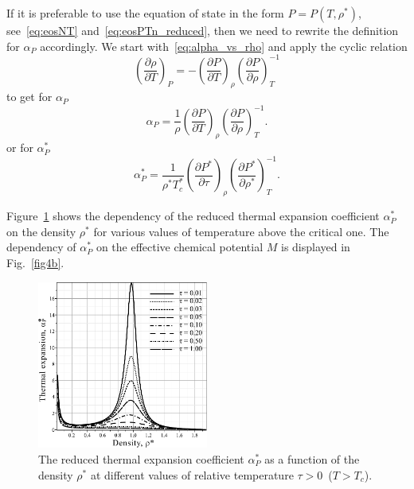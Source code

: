If it is preferable to use the equation of state in the form $P=P(T, \rho^*)$, see~\eqref{eq:eosNT} and~\eqref{eq:eosPTn_reduced}, then we need to rewrite the definition for $\alpha_P$ accordingly. We start with~\eqref{eq:alpha_vs_rho} and apply the cyclic relation
\begin{equation}
	\left(\frac{\partial \rho}{\partial T}\right)_P = - \left(\frac{\partial P}{\partial T}\right)_{\rho} \left(\frac{\partial P}{\partial \rho}\right)^{-1}_T
\end{equation}
to get for $\alpha_P$
\begin{equation}
	\alpha_P = \frac{1}{\rho} \left(\frac{\partial P}{\partial T}\right)_{\rho} \left(\frac{\partial P}{\partial \rho}\right)^{-1}_T.
\end{equation}
or for $\alpha^*_P$
\begin{equation}
	\alpha^*_P = \frac{1}{\rho^* T^*_c} \left(\frac{\partial P^*}{\partial \tau}\right)_{\rho} \left(\frac{\partial P^*}{\partial \rho^*}\right)^{-1}_T.
\end{equation}

Figure~\ref{fig4a} shows the dependency of the reduced thermal expansion coefficient $\alpha^*_P$ on the density $\rho^*$ for various values of temperature above the critical one. The dependency of $\alpha^*_P$ on the effective chemical potential $M$ is displayed in Fig.~\ref{fig4b}.

\begin{figure}[h!] 
	\includegraphics[width=0.5\textwidth]{f4a.pdf}
	\vskip-3mm
	\caption{The reduced thermal expansion coefficient $\alpha^*_P$ as a function of the density $\rho^*$ at different values of relative temperature $\tau > 0$~($T > T_c$). 
	}
	\label{fig4a}
\end{figure}


